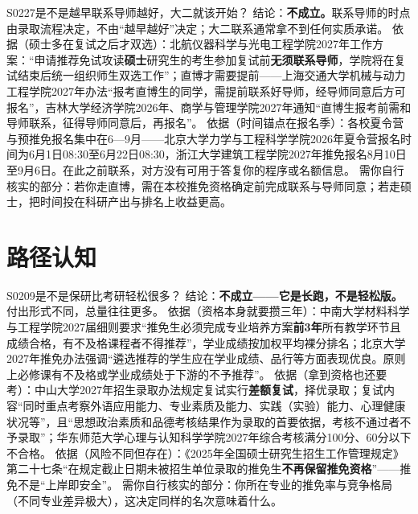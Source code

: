 \begin{qa}{S0227}{是不是越早联系导师越好，大二就该开始？}
结论：\textbf{不成立。}联系导师的时点由录取流程决定，不由“越早越好”决定；大二联系通常拿不到任何实质承诺。
依据（硕士多在复试之后才双选）：北航仪器科学与光电工程学院2027年工作方案：“申请推荐免试攻读\textbf{硕士}研究生的考生参加复试前\textbf{无须联系导师}，学院将在复试结束后统一组织师生双选工作”；直博才需要提前——上海交通大学机械与动力工程学院2027年办法“报考直博生的同学，需提前联系好导师，经导师同意后方可报名”，吉林大学经济学院2026年、商学与管理学院2027年通知“直博生报考前需和导师联系，征得导师同意后，再报名”。
依据（时间锚点在报名季）：各校夏令营与预推免报名集中在6—9月——北京大学力学与工程科学学院2026年夏令营报名时间为6月1日08:30至6月22日08:30，浙江大学建筑工程学院2027年推免报名8月10日至9月6日。在此之前联系，对方没有可用于答复你的程序或名额信息。
需你自行核实的部分：若你走直博，需在本校推免资格确定前完成联系与导师同意；若走硕士，把时间投在科研产出与排名上收益更高。
\end{qa}

\section{路径认知}
\begin{qa}{S0209}{是不是保研比考研轻松很多？}
结论：\textbf{不成立——它是长跑，不是轻松版。}付出形式不同，总量往往更多。
依据（资格本身就要攒三年）：中南大学材料科学与工程学院2027届细则要求“推免生必须完成专业培养方案\textbf{前3年}所有教学环节且成绩合格，有不及格课程者不得推荐”，学业成绩按加权平均裸分排名；北京大学2027年推免办法强调“遴选推荐的学生应在学业成绩、品行等方面表现优良。原则上必修课有不及格或学业成绩处于下游的不予推荐”。
依据（拿到资格也还要考）：中山大学2027年招生录取办法规定复试实行\textbf{差额复试}，择优录取；复试内容“同时重点考察外语应用能力、专业素质及能力、实践（实验）能力、心理健康状况等”，且“思想政治素质和品德考核结果作为录取的首要依据，考核不通过者不予录取”；华东师范大学心理与认知科学学院2027年综合考核满分100分、60分以下不合格。
依据（风险不同但存在）：《2025年全国硕士研究生招生工作管理规定》第二十七条“在规定截止日期未被招生单位录取的推免生\textbf{不再保留推免资格}”——推免不是“上岸即安全”。
需你自行核实的部分：你所在专业的推免率与竞争格局（不同专业差异极大），这决定同样的名次意味着什么。
\end{qa}


